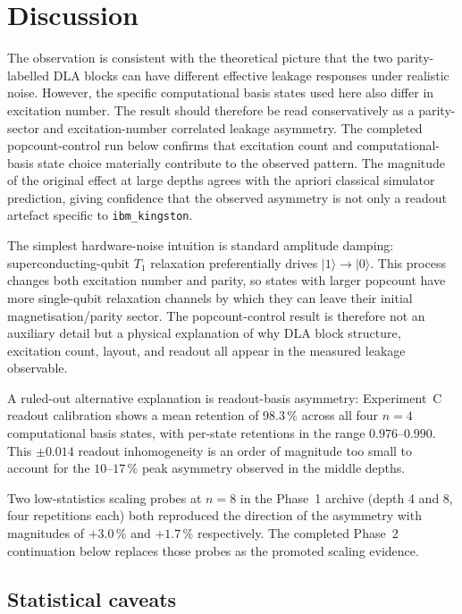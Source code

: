\documentclass[reprint,aps,physrev,superscriptaddress,floatfix,longbibliography]{revtex4-2}
\begin{document}
\section{Discussion}

The observation is consistent with the theoretical picture that the
two parity-labelled DLA blocks can have different effective leakage
responses under realistic noise. However, the specific computational
basis states used here also differ in excitation number. The result
should therefore be read conservatively as a parity-sector and
excitation-number correlated leakage asymmetry. The completed
popcount-control run below confirms that excitation count and
computational-basis state choice materially contribute to the
observed pattern. The magnitude of the original effect at large
depths agrees with the apriori classical simulator prediction, giving
confidence that the observed asymmetry is not only a readout artefact
specific to \texttt{ibm\_kingston}.

The simplest hardware-noise intuition is standard amplitude damping:
superconducting-qubit $T_1$ relaxation preferentially drives
$|1\rangle\rightarrow |0\rangle$. This process changes both
excitation number and parity, so states with larger popcount have more
single-qubit relaxation channels by which they can leave their initial
magnetisation/parity sector. The popcount-control result is therefore
not an auxiliary detail but a physical explanation of why DLA block
structure, excitation count, layout, and readout all appear in the
measured leakage observable.

A ruled-out alternative explanation is readout-basis asymmetry:
Experiment~C readout calibration shows a mean retention of
$98.3\,\%$ across all four $n = 4$ computational basis states, with
per-state retentions in the range $0.976$--$0.990$. This
$\pm 0.014$ readout inhomogeneity is an order of magnitude too small
to account for the $10$--$17\,\%$ peak asymmetry observed in the
middle depths.

Two low-statistics scaling probes at $n = 8$ in the Phase~1 archive
(depth 4 and 8, four repetitions each) both reproduced the direction
of the asymmetry with magnitudes of $+3.0\,\%$ and $+1.7\,\%$
respectively. The completed Phase~2 continuation below replaces those
probes as the promoted scaling evidence.

\subsection{Statistical caveats}
\end{document}
